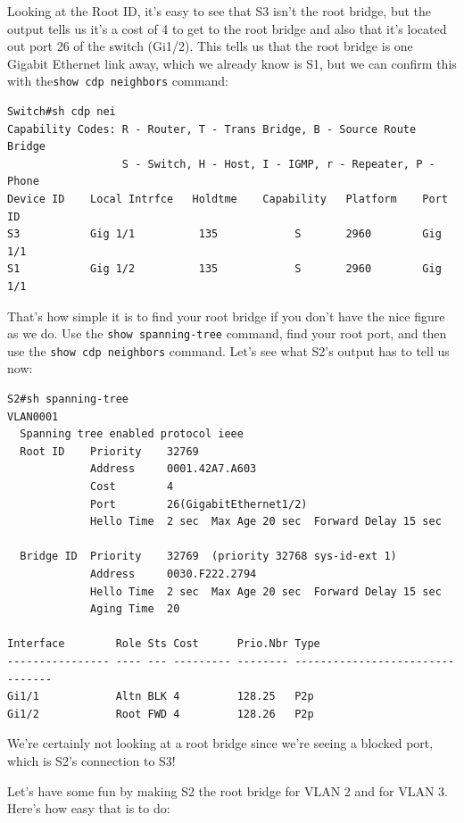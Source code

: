 \documentclass[b5paper,11pt]{memoir}
\begin{document}
Looking at the Root ID, it's easy to see that S3 isn't the root bridge,
but the output tells us it's a cost of 4 to get to the root bridge and
also that it's located out port 26 of the switch (Gi1/2). This tells us
that the root bridge is one Gigabit Ethernet link away,
which we already know
is S1, but we can confirm this with the\texttt{show\ cdp\ neighbors}
command:

\begin{verbatim}
Switch#sh cdp nei
Capability Codes: R - Router, T - Trans Bridge, B - Source Route Bridge
                  S - Switch, H - Host, I - IGMP, r - Repeater, P - Phone
Device ID    Local Intrfce   Holdtme    Capability   Platform    Port ID
S3           Gig 1/1          135            S       2960        Gig 1/1
S1           Gig 1/2          135            S       2960        Gig 1/1
\end{verbatim}

That's how simple it is to find your root bridge if you don't have the
nice figure as we do. Use the \texttt{show\ spanning-tree} command, find
your root port, and then use the \texttt{show\ cdp\ neighbors} command.
Let's see what S2's output has to tell us now:

\begin{verbatim}
S2#sh spanning-tree
VLAN0001
  Spanning tree enabled protocol ieee
  Root ID    Priority    32769
             Address     0001.42A7.A603
             Cost        4
             Port        26(GigabitEthernet1/2)
             Hello Time  2 sec  Max Age 20 sec  Forward Delay 15 sec
 
  Bridge ID  Priority    32769  (priority 32768 sys-id-ext 1)
             Address     0030.F222.2794
             Hello Time  2 sec  Max Age 20 sec  Forward Delay 15 sec
             Aging Time  20
 
Interface        Role Sts Cost      Prio.Nbr Type
---------------- ---- --- --------- -------- --------------------------------
Gi1/1            Altn BLK 4         128.25   P2p
Gi1/2            Root FWD 4         128.26   P2p
\end{verbatim}

We're certainly not looking at a root bridge since we're seeing a
blocked port, which is S2's connection to S3!

Let's have some fun by making S2 the root bridge for VLAN 2 and for VLAN
3. Here's how easy that is to do:
\end{document}
